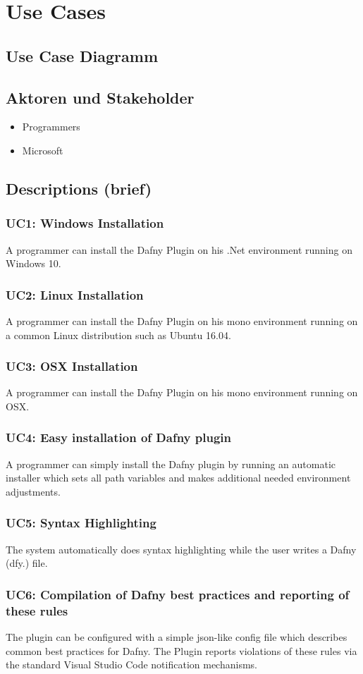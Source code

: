 \section{Use Cases}
\subsection{Use Case Diagramm}
\subsection{Aktoren und Stakeholder}
\begin{itemize}
	\item Programmers
	\item Microsoft
\end{itemize}
\subsection{Descriptions (brief)}
\subsubsection{UC1: Windows Installation}
A programmer can install the Dafny Plugin on his .Net environment running on Windows 10.
\subsubsection{UC2: Linux Installation}
A programmer can install the Dafny Plugin on his mono environment running on a common Linux distribution such as Ubuntu 16.04.
\subsubsection{UC3: OSX Installation}
A programmer can install the Dafny Plugin on his mono environment running on OSX.
\subsubsection{UC4: Easy installation of Dafny plugin}
A programmer can simply install the Dafny plugin by running an automatic installer which sets all path variables and makes additional needed environment adjustments.
\subsubsection{UC5: Syntax Highlighting}
The system automatically does syntax highlighting while the user writes a Dafny (dfy.) file.
\subsubsection{UC6: Compilation of Dafny best practices and reporting of these rules}
The plugin can be configured with a simple json-like config file which describes common best practices for Dafny. The Plugin reports violations of these rules via the standard Visual Studio Code notification mechanisms.
